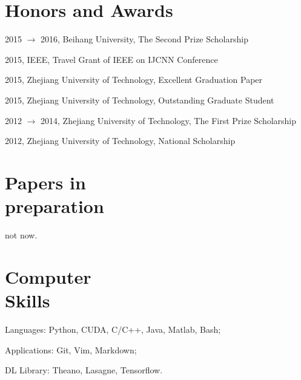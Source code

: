 \documentclass[margin,line]{resume}
\begin{document}
\begin{resume}
\section{Honors and Awards}

2015 $\to$ 2016, Beihang University, The Second Prize Scholarship

2015, IEEE, Travel Grant of IEEE on IJCNN Conference

2015, Zhejiang University of Technology, Excellent Graduation Paper

2015, Zhejiang University of Technology, Outstanding Graduate Student

2012 $\to$ 2014, Zhejiang University of Technology, The First Prize Scholarship

2012, Zhejiang University of Technology, National Scholarship




\section{Papers in \\ preparation}
not now.

\section{Computer \\ Skills}
Languages:  Python, CUDA, C/C++, Java, Matlab, Bash;

Applications: Git, Vim, Markdown;

DL Library: Theano, Lasagne, Tensorflow.\\

\end{resume}
\end{document}
